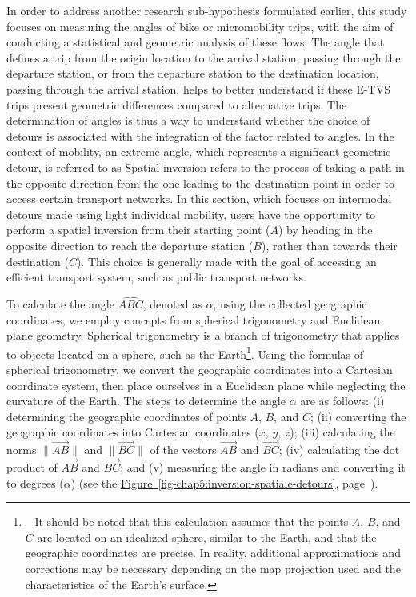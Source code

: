 \begin{refsegment}
In order to address another research sub-hypothesis formulated earlier, this study focuses on measuring the angles of bike or micromobility trips, with the aim of conducting a statistical and geometric analysis of these flows. The angle that defines a trip from the origin location to the arrival station, passing through the departure station, or from the departure station to the destination location, passing through the arrival station, helps to better understand if these \acrshort{E-TVS} trips present geometric differences compared to alternative trips. The determination of angles is thus a way to understand whether the choice of detours is associated with the integration of the factor related to angles. In the context of mobility, an extreme angle, which represents a significant geometric detour, is referred to as  Spatial inversion refers to the process of taking a path in the opposite direction from the one leading to the destination point in order to access certain transport networks. In this section, which focuses on intermodal detours made using light individual mobility, users have the opportunity to perform a spatial inversion from their starting point (\(A\)) by heading in the opposite direction to reach the departure station (\(B\)), rather than towards their destination (\(C\)). This choice is generally made with the goal of accessing an efficient transport system, such as public transport networks.%

To calculate the angle $\widehat{ABC}$, denoted as $\alpha$, using the collected geographic coordinates, we employ concepts from spherical trigonometry and Euclidean plane geometry. Spherical trigonometry is a branch of trigonometry that applies to objects located on a sphere, such as the Earth\footnote{~
It should be noted that this calculation assumes that the points \(A\), \(B\), and \(C\) are located on an idealized sphere, similar to the Earth, and that the geographic coordinates are precise. In reality, additional approximations and corrections may be necessary depending on the map projection used and the characteristics of the Earth's surface.
}. Using the formulas of spherical trigonometry, we convert the geographic coordinates into a Cartesian coordinate system, then place ourselves in a Euclidean plane while neglecting the curvature of the Earth. The steps to determine the angle $\alpha$ are as follows: (i) determining the geographic coordinates of points \(A\), \(B\), and \(C\); (ii) converting the geographic coordinates into Cartesian coordinates (\(x\), \(y\), \(z\)); (iii) calculating the norms $\lVert \vec{AB} \rVert$ and $\lVert \vec{BC} \rVert$ of the vectors $\vec{AB}$ and $\vec{BC}$; (iv) calculating the dot product of $\vec{AB}$ and $\vec{BC}$; and (v) measuring the angle in radians and converting it to degrees ($\alpha$) (see the \hyperref[fig-chap5:inversion-spatiale-detours]{Figure~\ref{fig-chap5:inversion-spatiale-detours}}, page~\pageref{fig-chap5:inversion-spatiale-detours}).%


\end{refsegment}
